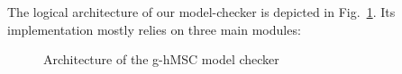 The logical architecture of our model-checker is depicted in Fig.~\ref{image:model-checker}. Its implementation mostly relies on three main modules:

\begin{figure}[H]
\centering{}
  \caption{Architecture of the g-hMSC model checker\label{image:model-checker}}
\end{figure}

